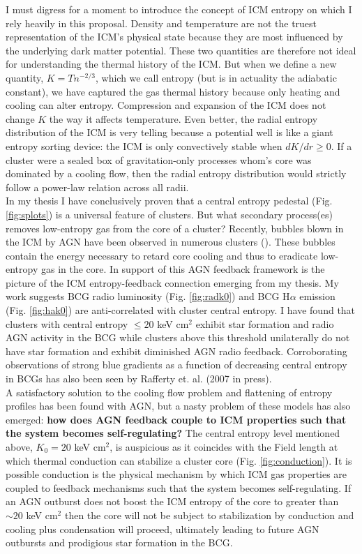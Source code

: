 \documentclass[11pt]{article}
\begin{document}
I must digress for a moment to introduce the concept of ICM entropy
on which I rely heavily in this proposal. Density and temperature are
not the truest representation of the ICM's physical state because they
are most influenced by the underlying dark matter potential. These two
quantities are therefore not ideal for understanding the thermal
history of the ICM. But when we define a new quantity, $K=Tn^{-2/3}$,
which we call entropy (but is in actuality the adiabatic constant), we
have captured the gas thermal history because only heating and cooling
can alter entropy. Compression and expansion of the ICM does not
change $K$ the way it affects temperature. Even better, the radial
entropy distribution of the ICM is very telling because a
potential well is like a giant entropy sorting device: the ICM is only
convectively stable when $dK/dr \geq 0$. If a cluster were a sealed box
of gravitation-only processes whom's core was dominated by a cooling
flow, then the radial entropy distribution would strictly follow a
power-law relation across all radii.\\

In my thesis I have conclusively proven that a central entropy
pedestal (Fig. \ref{fig:splots}) is a universal feature of
clusters. But what secondary process(es) removes low-entropy gas from
the core of a cluster? Recently, bubbles blown in the ICM by AGN have
been observed in numerous clusters (\cite{2007ARA&A..45..117M}). These
bubbles contain the energy necessary to retard core cooling and thus
to eradicate low-entropy gas in the core. In support of this AGN
feedback framework is the picture of the ICM entropy-feedback
connection emerging from my thesis. My work suggests BCG radio
luminosity (Fig. \ref{fig:radk0}) and BCG H$\alpha$ emission
(Fig. \ref{fig:hak0}) are anti-correlated with cluster central
entropy. I have found that clusters with central entropy $\leq 20$ keV
cm$^2$ exhibit star formation and radio AGN activity in the BCG while
clusters above this threshold unilaterally do not have star formation
and exhibit diminished AGN radio feedback. Corroborating observations
of strong blue gradients as a function of decreasing central entropy
in BCGs has also been seen by Rafferty et. al. (2007 in press).\\

A satisfactory solution to the cooling flow problem and flattening of
entropy profiles has been found with AGN, but a nasty problem of these
models has also emerged: {\bf how does AGN feedback couple to ICM
properties such that the system becomes self-regulating?} The central
entropy level mentioned above, $K_0 = 20$ keV cm$^{2}$, is auspicious
as it coincides with the Field length at which thermal conduction can
stabilize a cluster core (Fig. \ref{fig:conduction}). It is possible
conduction is the physical mechanism by which ICM gas properties are
coupled to feedback mechanisms such that the system becomes
self-regulating. If an AGN outburst does not boost the ICM entropy of
the core to greater than $\sim 20 $ keV cm$^{2}$ then the core will
not be subject to stabilization by conduction and cooling plus
condensation will proceed, ultimately leading to future AGN outbursts
and prodigious star formation in the BCG.\\
\end{document}
